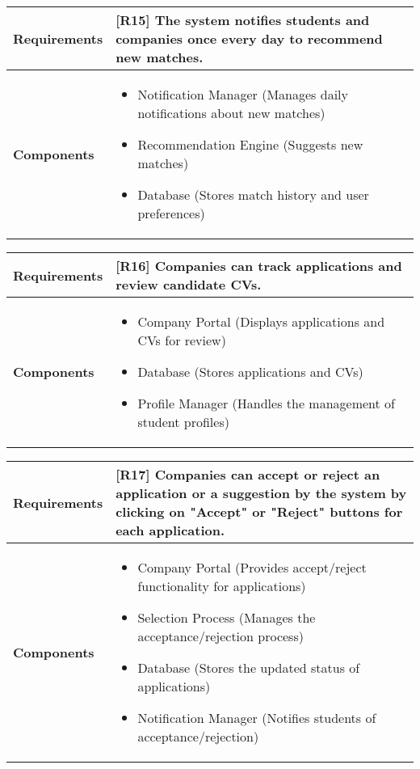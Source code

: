 \begin{table}[h!]
\centering
\begin{tabular}{|l|p{10cm}|}
\hline
\textbf{Requirements} & 
[R15] The system notifies students and companies once every day to recommend new matches.\\
\hline
\textbf{Components} & 
\begin{itemize}
    \item Notification Manager (Manages daily notifications about new matches)
    \item Recommendation Engine (Suggests new matches)
    \item Database (Stores match history and user preferences)
\end{itemize} \\
\hline
\end{tabular}
\label{tab:req_comp}
\end{table}

\begin{table}[h!]
\centering
\begin{tabular}{|l|p{10cm}|}
\hline
\textbf{Requirements} & 
[R16] Companies can track applications and review candidate CVs.\\
\hline
\textbf{Components} & 
\begin{itemize}
    \item Company Portal (Displays applications and CVs for review)
    \item Database (Stores applications and CVs)
    \item Profile Manager (Handles the management of student profiles)
\end{itemize} \\
\hline
\end{tabular}
\label{tab:req_comp}
\end{table}

\begin{table}[h!]
\centering
\begin{tabular}{|l|p{10cm}|}
\hline
\textbf{Requirements} & 
[R17] Companies can accept or reject an application or a suggestion by the system by clicking on "Accept" or "Reject" buttons for each application.\\
\hline
\textbf{Components} & 
\begin{itemize}
    \item Company Portal (Provides accept/reject functionality for applications)
    \item Selection Process (Manages the acceptance/rejection process)
    \item Database (Stores the updated status of applications)
    \item Notification Manager (Notifies students of acceptance/rejection)
\end{itemize} \\
\hline
\end{tabular}
\label{tab:req_comp}
\end{table}

